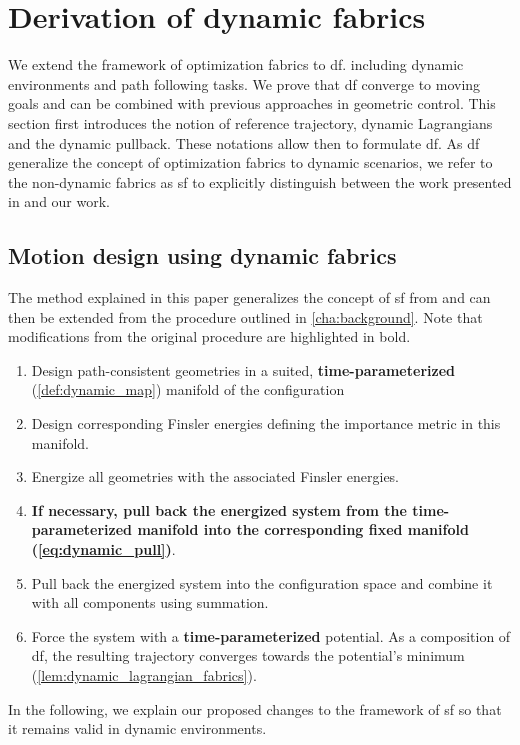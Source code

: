 \section{Derivation of dynamic fabrics}%
\label{sec:methods}

We extend the framework of optimization fabrics to \acf{df}.
including
dynamic environments and path following tasks. We prove that \ac{df}
converge to moving goals and can be combined with previous approaches in geometric
control.
%
This section first introduces the notion of reference trajectory, dynamic Lagrangians and
the dynamic pullback. These notations allow then to formulate \ac{df}. 
As \ac{df} generalize the concept of optimization fabrics to dynamic scenarios, we refer 
to the non-dynamic fabrics as \acf{sf} to explicitly distinguish between the work
presented in \cite{Ratliff2020} and our work.

\subsection{Motion design using dynamic fabrics}%
\label{sub:motion_design_using_dynamic_fabrics}

The method explained in this paper generalizes the concept of \ac{sf}
from \cite{Ratliff2020} and can then be extended from the procedure outlined in
\cref{cha:background}. Note that modifications from the
original procedure are highlighted in bold.

\begin{enumerate}
  \item Design path-consistent geometries in a suited, \textbf{time-parameterized} (\cref{def:dynamic_map}) manifold of the configuration
  \item Design corresponding Finsler energies defining the importance metric in this manifold.
  \item Energize all geometries with the associated Finsler energies.
  \item \textbf{If necessary, pull back the energized system from the time-parameterized manifold into
    the corresponding fixed manifold (\cref{eq:dynamic_pull})}.
  \item Pull back the energized system into the configuration space and combine it with
    all components using summation.
  \item Force the system with a \textbf{time-parameterized} potential. As a composition of \ac{df}, 
    the resulting trajectory converges towards the potential's minimum (\cref{lem:dynamic_lagrangian_fabrics}).
\end{enumerate}
In the following, we explain our proposed changes to the framework of \ac{sf} so that it remains
valid in dynamic environments.

